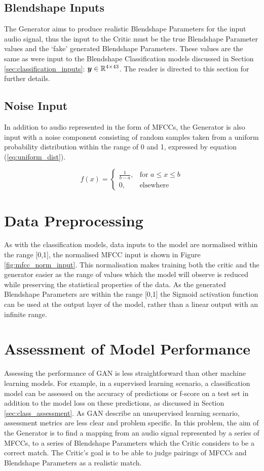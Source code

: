 \subsection{Blendshape Inputs}
The Generator aims to produce realistic Blendshape Parameters for the input audio signal, thus the input to the Critic must be the true Blendshape Parameter values and the `fake' generated Blendshape Parameters.
These values are the same as were input to the Blendshape Classification models discussed in Section \ref{sec:classification_inputs}: ${\boldsymbol{{y}}} \in \mathbb{R}^{4 \times 43}$.
The reader is directed to this section for further details.

\subsection{Noise Input}
In addition to audio represented in the form of MFCCs, the Generator is also input with a noise component consisting of random samples taken from a uniform probability distribution within the range of 0 and 1, expressed by equation (\ref{eq:uniform_dist}).

\begin{equation}\label{eq:uniform_dist}
    f(x)=\begin{cases}
      \frac{1}{b-a}, & \text{for $a \leq x \leq b$}\\
      0, & \text{elsewhere}
    \end{cases}
\end{equation}

\section{Data Preprocessing}
As with the classification models, data inputs to the model are normalised within the range [0,1], the normalised MFCC input is shown in Figure \ref{fig:mfcc_norm_input}.
This normalisation makes training both the critic and the generator easier as the range of values which the model will observe is reduced while preserving the statistical properties of the data.
As the generated Blendshape Parameters are within the range [0,1] the Sigmoid activation function can be used at the output layer of the model, rather than a linear output with an infinite range.

\section{Assessment of Model Performance} \label{sec:gan_assessment}
Assessing the performance of GAN is less straightforward than other machine learning models.
For example, in a supervised learning scenario, a classification model can be assessed on the accuracy of predictions or f-score on a test set in addition to the model loss on these predictions, as discussed in Section \ref{sec:class_assessment}.
As GAN describe an unsupervised learning scenario, assessment metrics are less clear and problem specific.
In this problem, the aim of the Generator is to find a mapping from an audio signal represented by a series of MFCCs, to a series of Blendshape Parameters which the Critic considers to be a correct match.
The Critic's goal is to be able to judge pairings of MFCCs and Blendshape Parameters as a realistic match.

